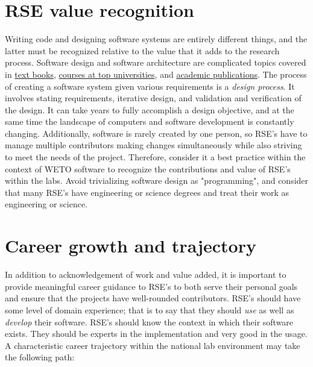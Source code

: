 \documentclass[]{nrel}
\begin{document}
\begin{appendices}
\section{RSE value recognition}
Writing code and designing software systems are entirely different things, and the latter
must be recognized relative to the value that it adds to the research process.
Software design and software architecture are complicated topics covered in
\href{https://www.amazon.com/s?k=software+design&i=stripbooks&crid=2L9GNOIMWHMFD&sprefix=software+design%2Cstripbooks%2C166&ref=nb_sb_noss_2}{text books},
\href{https://web.stanford.edu/~ouster/cs190-winter23/}{courses at top universities}, and
\href{https://www.researchgate.net/search.Search.html?query=software+architecture&type=publication&subfilter%5BpublicationType%5D=article%2Fbook&subfilter%5BstartYear%5D=2022}{academic publications}.
The process of creating a software system given various requirements is a \textit{design process}.
It involves stating requirements, iterative design, and validation and verification of the design.
It can take years to fully accomplish a design objective, and at the same time the landscape of
computers and software development is constantly changing.
Additionally, software is rarely created by one person, so RSE's have to manage multiple
contributors making changes simultaneously while also striving to meet the needs of the project.
Therefore, consider it a best practice within the context of WETO software to recognize
the contributions and value of RSE's within the labs.
Avoid trivializing software design as "programming", and consider that many RSE's have engineering
or science degrees and treat their work as engineering or science.

\section{Career growth and trajectory}
In addition to acknowledgement of work and value added, it is important to provide meaningful
career guidance to RSE's to both serve their personal goals and ensure
that the projects have well-rounded contributors. RSE's should have some level of domain
experience; that is to say that they should \textit{use} as well as \textit{develop} their software.
RSE's should know the context in which their software exists.
They should be experts in the implementation and very good in the usage.
A characteristic career trajectory within the national lab environment may take the following path:


\end{appendices}
\end{document}
